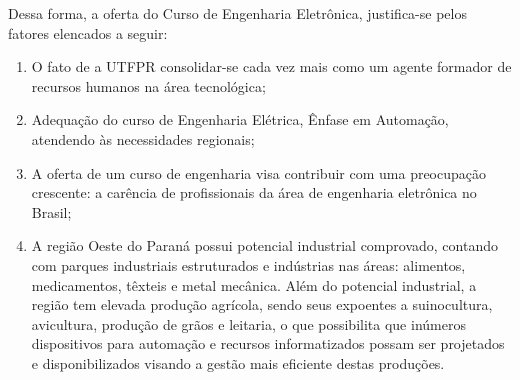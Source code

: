 Dessa forma, a oferta do Curso de Engenharia Eletrônica, justifica-se pelos fatores elencados a seguir:

\begin{enumerate}
	
	\item O fato de a UTFPR consolidar-se cada vez mais como um agente formador de recursos humanos na área tecnológica;
	
	\item Adequação do curso de Engenharia Elétrica, Ênfase em Automação, atendendo às necessidades regionais;
	
	\item A oferta de um curso de engenharia visa contribuir com uma preocupação crescente: a carência de profissionais da área de engenharia eletrônica no Brasil;
	
	\item A região Oeste do Paraná possui potencial industrial comprovado, contando com parques industriais estruturados e indústrias nas áreas: alimentos, medicamentos, têxteis e metal mecânica. Além do potencial industrial, a região tem elevada produção agrícola, sendo seus expoentes a suinocultura, avicultura, produção de grãos e leitaria, o que possibilita que inúmeros dispositivos para automação e recursos informatizados possam ser projetados e disponibilizados visando a gestão mais eficiente destas produções.
	
\end{enumerate}

